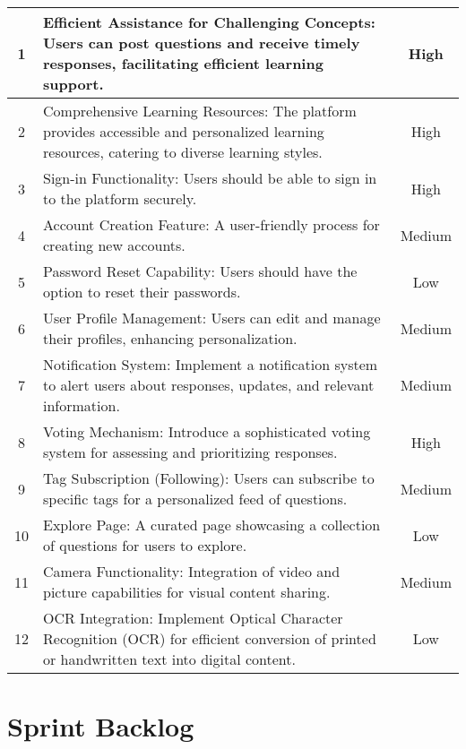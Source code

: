 \begin{longtable}{|c|p{8cm}|c|}
    1 & Efficient Assistance for Challenging Concepts: Users can post questions and receive timely responses, facilitating efficient learning support. & High \\
    \hline
    2 & Comprehensive Learning Resources: The platform provides accessible and personalized learning resources, catering to diverse learning styles. & High \\
    \hline
    \hline
    3 & Sign-in Functionality: Users should be able to sign in to the platform securely. & High \\
    \hline
    4 & Account Creation Feature: A user-friendly process for creating new accounts. & Medium \\
    \hline
    5 & Password Reset Capability: Users should have the option to reset their passwords. & Low \\
    \hline
    6 & User Profile Management: Users can edit and manage their profiles, enhancing personalization. & Medium \\
    \hline
    7 & Notification System: Implement a notification system to alert users about responses, updates, and relevant information. & Medium \\
    \hline
    8 & Voting Mechanism: Introduce a sophisticated voting system for assessing and prioritizing responses. & High \\
    \hline
    9 & Tag Subscription (Following): Users can subscribe to specific tags for a personalized feed of questions. & Medium \\
    \hline
    10 & Explore Page: A curated page showcasing a collection of questions for users to explore. & Low \\
    \hline
    11 & Camera Functionality: Integration of video and picture capabilities for visual content sharing. & Medium \\
    \hline
    12 & OCR Integration: Implement Optical Character Recognition (OCR) for efficient conversion of printed or handwritten text into digital content. & Low \\
\end{longtable}


\section{Sprint Backlog}\label{sprint_backlog}

